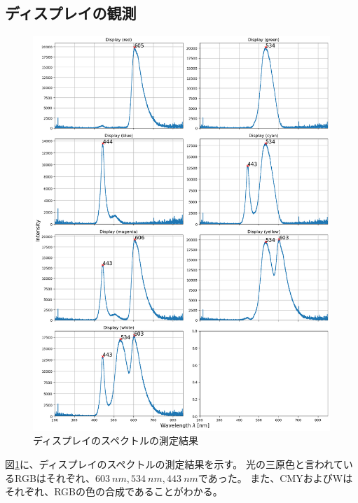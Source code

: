 \documentclass[a4paper]{ltjsarticle}
\begin{document}
\subsection{ディスプレイの観測}
\begin{figure}
    \centering
    \includegraphics[width=0.98\columnwidth]{./images/spectrum_displays.png}
    \caption{ディスプレイのスペクトルの測定結果}
    \label{fig:spectrum_display}
\end{figure}
図\ref{fig:spectrum_display}に、ディスプレイのスペクトルの測定結果を示す。
光の三原色と言われているRGBはそれぞれ、$\SI{603}{nm}, \SI{534}{nm}, \SI{443}{nm}$であった。
また、CMYおよびWはそれぞれ、RGBの色の合成であることがわかる。
\end{document}
